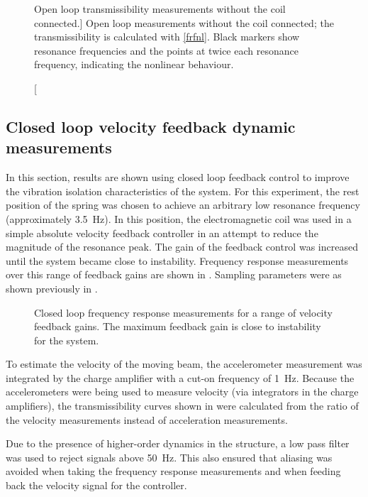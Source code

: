 \documentclass[11pt,a4paper]{memoir}
\begin{document}
\begin{figure}
  \caption
    [Open loop transmissibility measurements without the coil connected.]
    {Open loop measurements without the coil connected; the transmissibility is calculated with \eqref{frfnl}. Black markers show resonance frequencies and the points at twice each resonance frequency, indicating the nonlinear behaviour.}
\end{figure}

\subsection{Closed loop velocity feedback dynamic measurements}

In this section, results are shown using closed loop feedback control to improve the vibration isolation characteristics of the system.
For this experiment, the rest position of the spring was chosen to achieve an arbitrary low
resonance frequency (approximately \SI{3.5}{Hz}).
In this position, the electromagnetic coil was used in a simple absolute velocity
feedback controller in an attempt to reduce the magnitude of the resonance peak.
The gain of the feedback control was increased until the system became close
to instability.
Frequency response measurements over this range of feedback gains are shown in .
Sampling parameters were as shown previously in .

\begin{figure}
  \caption{Closed loop frequency response measurements for a range of velocity feedback gains. The maximum feedback gain is close to instability for the system.}
\end{figure}

To estimate the velocity of the moving beam, the accelerometer measurement was
integrated by the charge amplifier with a cut-on frequency of \SI{1}{Hz}.
Because the accelerometers were being used to measure velocity (via integrators in the charge amplifiers), the transmissibility curves shown in  were calculated from the
ratio of the velocity measurements instead of acceleration measurements.

Due to the presence of higher-order dynamics in the structure, a low pass
filter was used to reject signals above \SI{50}{Hz}. This also ensured that
aliasing was avoided when taking the frequency response measurements and when
feeding back the velocity signal for the controller.
\end{document}

